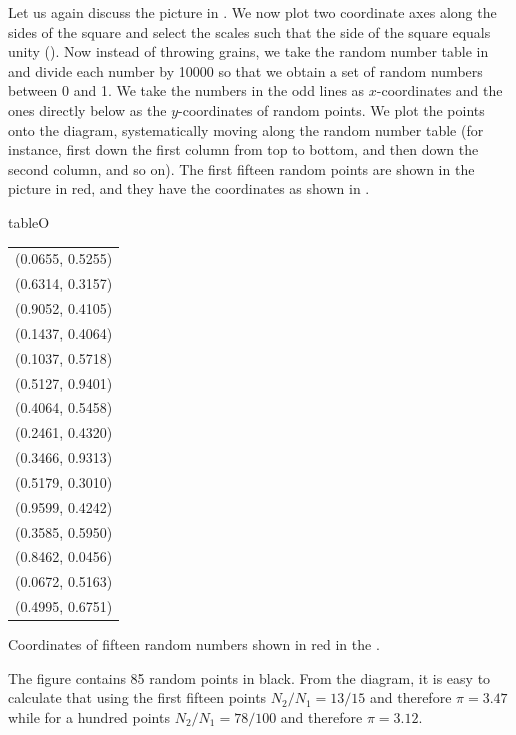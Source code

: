  Let us again discuss the picture in . We now plot two coordinate axes along the sides of the square and select the scales such that the side of the square equals unity (). Now instead of throwing grains, we take the random number table in  and divide each number by \num{10000} so that we obtain a set of random numbers between 0 and 1. We take the numbers in the odd lines as $x$-coordinates and the ones directly below as the $y$-coordinates of random points. We plot the points onto the diagram, systematically
moving along the random number table (for instance, first down the first
column from top to bottom, and then down the second column, and so
on). The first fifteen random points are shown in the picture in red, and
they have the coordinates as shown in .%
\begin{wrapfloat}{table}{O}{\mfwidth}
\centering
\begin{smaller}
\begin{tabular}{l}
(0.0655, 0.5255) \\
 (0.6314, 0.3157) \\
  (0.9052, 0.4105) \\
(0.1437, 0.4064) \\
 (0.1037, 0.5718) \\
  (0.5127, 0.9401) \\
(0.4064, 0.5458) \\ 
(0.2461, 0.4320) \\ 
(0.3466, 0.9313) \\ 
(0.5179, 0.3010) \\ 
(0.9599, 0.4242) \\
 (0.3585, 0.5950) \\ 
(0.8462, 0.0456) \\
 (0.0672, 0.5163) \\
  (0.4995, 0.6751) \\
\end{tabular}
\end{smaller}
\caption{Coordinates of fifteen random numbers shown in red in the . \label{random-coord}}
\end{wrapfloat}
The figure contains 85 random points in black. From
the diagram, it is easy to calculate that using the first fifteen points
$N_{2}/N_{1}= 13/15$ and therefore $\pi = 3.47$ while for a hundred points
$N_{2}/N_{1}= 78/100$ and therefore $\pi = 3.12$.

